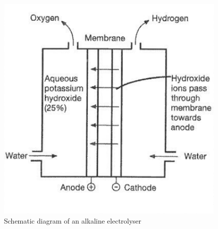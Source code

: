 \documentclass{article}
\begin{document}
    \begin{figure}
        \centering
        \includegraphics[scale=0.4]{./electro.png}
        \caption{Schematic diagram of an alkaline electrolyser \cite{ETH}}
    \end{figure}
\end{document}
